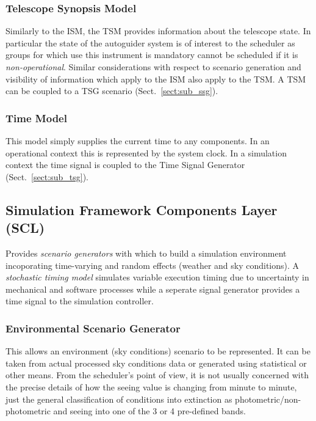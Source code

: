 \subsubsection{Telescope Synopsis Model}
Similarly to the ISM, the TSM provides information about the telescope state. In particular the state of the autoguider system is of interest to the scheduler as groups for which use this instrument is mandatory cannot be scheduled if it is \emph{non-operational}. Similar considerations with respect to scenario generation and visibility of information which apply to the ISM also apply to the TSM. A TSM can be coupled to a TSG scenario (Sect.~\ref{sect:sub_ssg}).

\subsubsection{Time Model} 
This model simply supplies the current time to any components. In an operational context this is represented by the system clock. In a simulation context the time signal is coupled to the Time Signal Generator (Sect.~\ref{sect:sub_tsg}).


\subsection{Simulation Framework Components Layer (SCL)}
\label{sec:sub_sfcl} Provides \emph{scenario generators} with which to build a simulation environment incoporating time-varying and random effects (weather and sky conditions). A \emph{stochastic timing model} simulates variable execution timing due to uncertainty in mechanical and software processes while a seperate signal generator provides a time signal to the simulation controller.

\subsubsection{Environmental Scenario Generator}
\label{sect:sub_esg}
This allows an environment (sky conditions) scenario to be represented. It can be taken from actual processed sky conditions data or generated using statistical or other means. From the scheduler's point of view, it is not usually concerned with the precise details of how the seeing value is changing from minute to minute, just the general classification of conditions into extinction as photometric/non-photometric and seeing into one of the 3 or 4 pre-defined bands.

